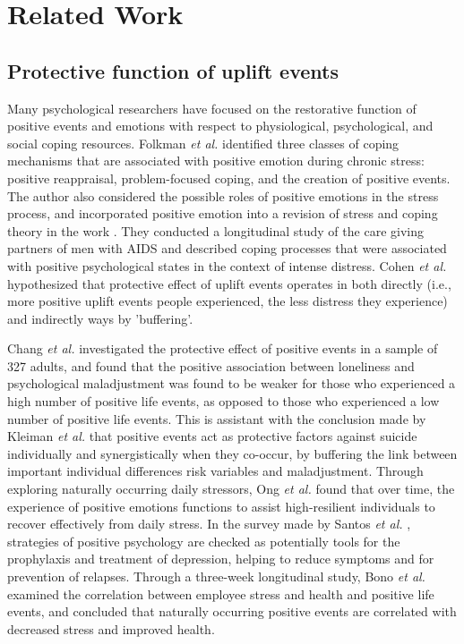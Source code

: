 \section{Related Work}
\label{sec:related}
\subsection{Protective function of uplift events}
Many psychological researchers have focused on the restorative function of positive events and emotions with respect to physiological, psychological, and social coping resources.
Folkman \emph{et al.}\cite{Folkman2010Stress} identified three classes of coping mechanisms that are associated with positive emotion during chronic stress: positive reappraisal, problem-focused coping, and the creation of positive events.
The author also considered the possible roles of positive emotions in the stress process, and incorporated positive emotion into a revision of stress and coping theory in the work \cite{Folkman1997Positive}.
They conducted a longitudinal study of the care giving partners of men with AIDS and described coping processes that were associated with positive psychological states in the context of intense distress.
Cohen \emph{et al.} \cite{Cohen2010Positive} hypothesized that protective effect of uplift events operates in both directly (i.e., more positive uplift events people experienced, the less distress they experience) and indirectly ways by 'buffering'.

Chang \emph{et al.} \cite{Chang2015Loneliness} investigated the protective effect of positive events in a sample of 327 adults, and found that the positive association between loneliness and psychological maladjustment was found to be weaker for those who experienced a high number of positive life events, as opposed to those who experienced a low number of positive life events.
This is assistant with the conclusion made by Kleiman \emph{et al.}
\cite{Evan2014Social} that positive events act as protective factors against suicide individually and synergistically when they co-occur, by buffering the link between important individual differences risk variables and maladjustment.
Through exploring naturally occurring daily stressors, Ong \emph{et al.}
\cite{Ong2006Psychological} found that over time,
the experience of positive emotions functions to assist high-resilient individuals to recover effectively from daily stress.
In the survey made by Santos \emph{et al.} \cite{Santos2013The}, strategies of positive psychology are checked as potentially tools for the prophylaxis and treatment of depression, helping to reduce symptoms and for prevention of relapses.
Through a three-week longitudinal study, Bono \emph{et al.}
\cite{Bono2013Building} examined the correlation between employee stress and health and positive life events, and concluded that naturally occurring positive events are correlated with decreased stress and improved health.

